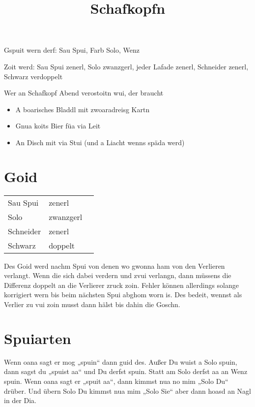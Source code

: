 \documentclass[11pt,a4paper]{scrartcl}		%
\title{Schafkopfn}
\makeatletter
\def\maketitle{
	\begin{center}
		\textbf{\huge \@title}
	\end{center}
}
\makeatother
\begin{document}

	\maketitle



	Gspuit wern derf: Sau Spui, Farb Solo, Wenz

	Zoit werd: Sau Spui zenerl, Solo zwanzgerl, jeder Lafade zenerl, Schneider zenerl, Schwarz verdoppelt



	
	Wer an Schafkopf Abend verostoitn wui, der braucht
	\begin{itemize}
		\item A boarisches Bladdl mit zwoaradreisg Kartn
		\item Gnua koits Bier füa via Leit
		\item An Disch mit via Stui (und a Liacht wenns späda werd)
	\end{itemize}


	\section{Goid}

	\begin{tabular}{lll}
		Sau Spui & zenerl \\
		Solo & zwanzgerl \\
		Schneider & zenerl \\
		Schwarz & doppelt \\ 
	\end{tabular}	


	Des Goid werd nachm Spui von denen wo gwonna ham von den Verlieren verlangt. 
	Wenn die sich dabei verdern und zvui verlangn, dann müssens die Differenz doppelt an die Verlierer zruck zoin. 
	Fehler können allerdings solange korrigiert wern bis beim nächsten Spui abghom worn is. Des bedeit, wennst als Verlier zu vui zoin musst dann hälst bis dahin die Goschn.




	\section{Spuiarten}
	Wenn oana sagt er mog „spuin“ dann guid des. Außer Du wuist a Solo spuin, dann sagst du „spuist aa“ und Du derfst spuin. Statt am Solo derfst aa an Wenz spuin. Wenn oana sagt er „spuit aa“, dann kimmst nua no mim „Solo Du“ drüber. Und übern Solo Du kimmst nua mim „Solo Sie“ aber dann hoasd an Nagl in der Dia.
\end{document}
